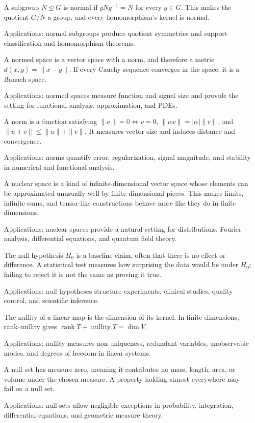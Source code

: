 A subgroup $N\trianglelefteq G$ is normal if $gNg^{-1}=N$ for every $g\in G$. This makes the quotient $G/N$ a group, and every homomorphism's kernel is normal. \par\noindent Applications: normal subgroups produce quotient symmetries and support classification and homomorphism theorems.

A normed space is a vector space with a norm, and therefore a metric $d(x,y)=\|x-y\|$. If every Cauchy sequence converges in the space, it is a Banach space. \par\noindent Applications: normed spaces measure function and signal size and provide the setting for functional analysis, approximation, and PDEs.

A norm is a function satisfying $\|v\|=0\iff v=0$, $\|\alpha v\|=|\alpha|\|v\|$, and $\|u+v\|\leq\|u\|+\|v\|$. It measures vector size and induces distance and convergence. \par\noindent Applications: norms quantify error, regularization, signal magnitude, and stability in numerical and functional analysis.

A nuclear space is a kind of infinite-dimensional vector space whose elements can be approximated unusually well by finite-dimensional pieces. This makes limits, infinite sums, and tensor-like constructions behave more like they do in finite dimensions. \par\noindent Applications: nuclear spaces provide a natural setting for distributions, Fourier analysis, differential equations, and quantum field theory.

The null hypothesis $H_0$ is a baseline claim, often that there is no effect or difference. A statistical test measures how surprising the data would be under $H_0$; failing to reject it is not the same as proving it true. \par\noindent Applications: null hypotheses structure experiments, clinical studies, quality control, and scientific inference.

The nullity of a linear map is the dimension of its kernel. In finite dimensions, rank--nullity gives $\operatorname{rank}T+\operatorname{nullity}T=\dim V$. \par\noindent Applications: nullity measures non-uniqueness, redundant variables, unobservable modes, and degrees of freedom in linear systems.

A null set has measure zero, meaning it contributes no mass, length, area, or volume under the chosen measure. A property holding almost everywhere may fail on a null set. \par\noindent Applications: null sets allow negligible exceptions in probability, integration, differential equations, and geometric measure theory.

